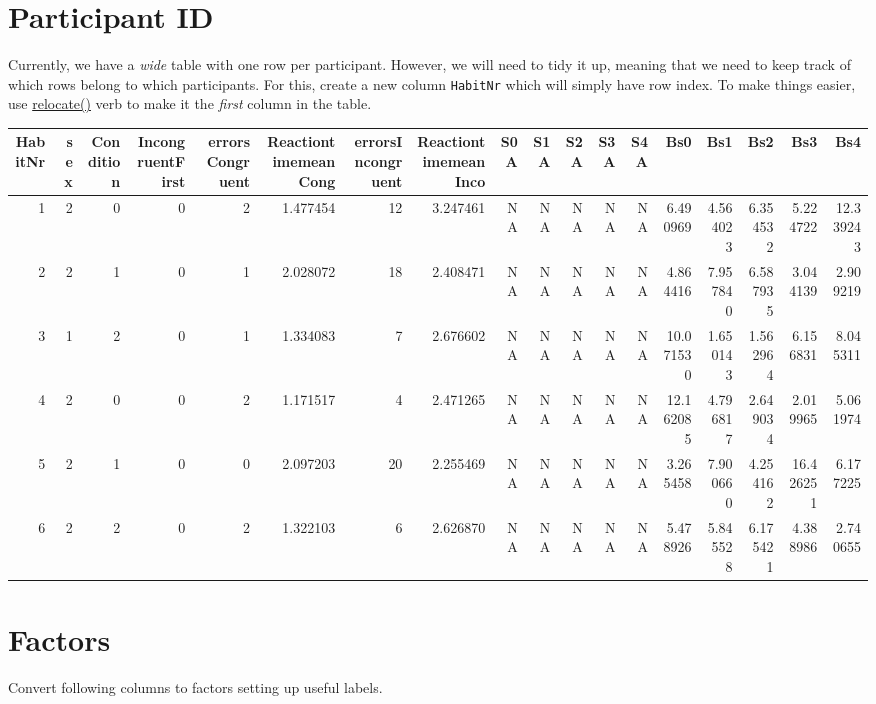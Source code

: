 \documentclass[
]{book}
\begin{document}
\hypertarget{participant-id}{%
\section{Participant ID}\label{participant-id}}

Currently, we have a \emph{wide} table with one row per participant. However, we will need to tidy it up, meaning that we need to keep track of which rows belong to which participants. For this, create a new column \texttt{HabitNr} which will simply have row index. To make things easier, use \href{https://dplyr.tidyverse.org/reference/relocate.html}{relocate()} verb to make it the \emph{first} column in the table.

\begin{tabular}{r|r|r|r|r|r|r|r|r|r|r|r|r|r|r|r|r|r}
\hline
HabitNr & sex & Condition & IncongruentFirst & errorsCongruent & ReactiontimemeanCong & errorsIncongruent & ReactiontimemeanInco & S0A & S1A & S2A & S3A & S4A & Bs0 & Bs1 & Bs2 & Bs3 & Bs4\\
\hline
1 & 2 & 0 & 0 & 2 & 1.477454 & 12 & 3.247461 & NA & NA & NA & NA & NA & 6.490969 & 4.564023 & 6.354532 & 5.224722 & 12.339243\\
\hline
2 & 2 & 1 & 0 & 1 & 2.028072 & 18 & 2.408471 & NA & NA & NA & NA & NA & 4.864416 & 7.957840 & 6.587935 & 3.044139 & 2.909219\\
\hline
3 & 1 & 2 & 0 & 1 & 1.334083 & 7 & 2.676602 & NA & NA & NA & NA & NA & 10.071530 & 1.650143 & 1.562964 & 6.156831 & 8.045311\\
\hline
4 & 2 & 0 & 0 & 2 & 1.171517 & 4 & 2.471265 & NA & NA & NA & NA & NA & 12.162085 & 4.796817 & 2.649034 & 2.019965 & 5.061974\\
\hline
5 & 2 & 1 & 0 & 0 & 2.097203 & 20 & 2.255469 & NA & NA & NA & NA & NA & 3.265458 & 7.900660 & 4.254162 & 16.426251 & 6.177225\\
\hline
6 & 2 & 2 & 0 & 2 & 1.322103 & 6 & 2.626870 & NA & NA & NA & NA & NA & 5.478926 & 5.845528 & 6.175421 & 4.388986 & 2.740655\\
\hline
\end{tabular}

\hypertarget{factors-1}{%
\section{Factors}\label{factors-1}}

Convert following columns to factors setting up useful labels.
\end{document}

